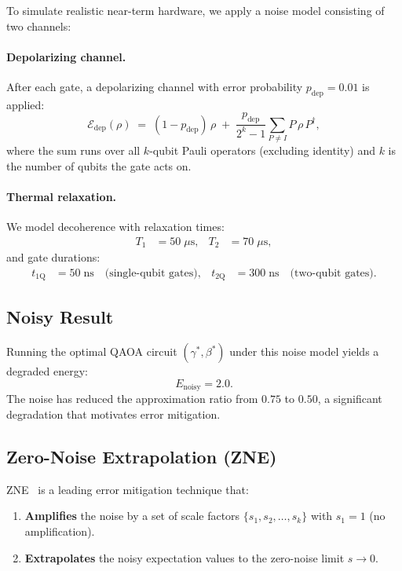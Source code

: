 \documentclass[11pt,a4paper]{article}
\begin{document}
To simulate realistic near-term hardware, we apply a noise model consisting of
two channels:

\paragraph{Depolarizing channel.}
After each gate, a depolarizing channel with error probability $p_{\text{dep}}
= 0.01$ is applied:
\begin{equation}
  \mathcal{E}_{\text{dep}}(\rho) \;=\; (1 - p_{\text{dep}})\,\rho
  \;+\; \frac{p_{\text{dep}}}{2^k - 1}\sum_{P \neq I} P\,\rho\, P^\dagger,
\end{equation}
where the sum runs over all $k$-qubit Pauli operators (excluding identity) and
$k$ is the number of qubits the gate acts on.

\paragraph{Thermal relaxation.}
We model decoherence with relaxation times:
\begin{align}
  T_1 &= 50\;\mu\text{s}, &
  T_2 &= 70\;\mu\text{s},
\end{align}
and gate durations:
\begin{align}
  t_{\text{1Q}} &= 50\;\text{ns} \quad \text{(single-qubit gates)}, &
  t_{\text{2Q}} &= 300\;\text{ns} \quad \text{(two-qubit gates)}.
\end{align}

\subsection{Noisy Result}

Running the optimal QAOA circuit $(\gamma^*,\beta^*)$ under this noise model
yields a degraded energy:
\begin{equation}
  E_{\text{noisy}} = 2.0.
\end{equation}
The noise has reduced the approximation ratio from $0.75$ to $0.50$, a
significant degradation that motivates error mitigation.

\subsection{Zero-Noise Extrapolation (ZNE)}

ZNE~\cite{temme2017,li2017} is a leading error mitigation technique that:
\begin{enumerate}
  \item \textbf{Amplifies} the noise by a set of scale factors
        $\{s_1, s_2, \ldots, s_k\}$ with $s_1 = 1$ (no amplification).
  \item \textbf{Extrapolates} the noisy expectation values to the zero-noise
        limit $s \to 0$.
\end{enumerate}
\end{document}
